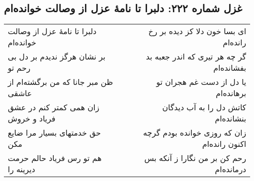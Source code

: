 \begin{center}
\section*{غزل شماره ۲۲۲: دلبرا تا نامهٔ عزل از وصالت خوانده‌ام}
\label{sec:222}
\begin{longtable}{l p{0.5cm} r}
دلبرا تا نامهٔ عزل از وصالت خوانده‌ام
&&
ای بسا خون دلا کز دیده بر رخ رانده‌ام
\\
بر نشان هرگز ندیدم بر دل بی رحم تو
&&
گر چه هر تیری که اندر جعبه بد بفشانده‌ام
\\
ظن مبر جانا که من برگشته‌ام از عاشقی
&&
یا دل از دست غم هجران تو برهانده‌ام
\\
زان همی کمتر کنم در عشق فریاد و خروش
&&
کاتش دل را به آب دیدگان بنشانده‌ام
\\
حق خدمتهای بسیار مرا ضایع مکن
&&
زان که روزی خوانده بودم گرچه اکنون رانده‌ام
\\
هم تو رس فریاد حالم حرمت دیرینه را
&&
رحم کن بر من نگارا ز آنکه بس درمانده‌ام
\\
\end{longtable}
\end{center}
